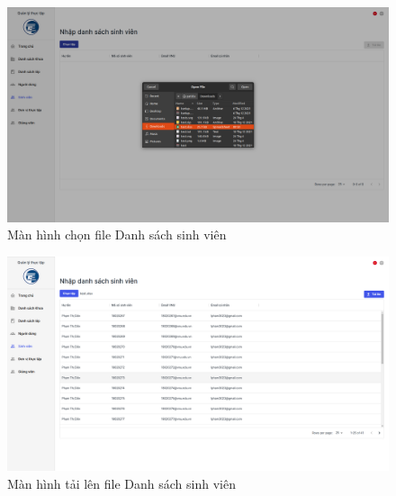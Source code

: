 \documentclass[./../main.tex]{subfiles}
\begin{document}
\begin{figure}[]
	\includegraphics[width=\linewidth]{./images/image27.png}
	\caption{Màn hình chọn file Danh sách sinh viên}
	\label{fig:choose_file}
\end{figure}

\begin{figure}[]
	\includegraphics[width=\linewidth]{./images/image28.png}
	\caption{Màn hình tải lên file Danh sách sinh viên}
	\label{fig:upload_list}
\end{figure}
\end{document}
